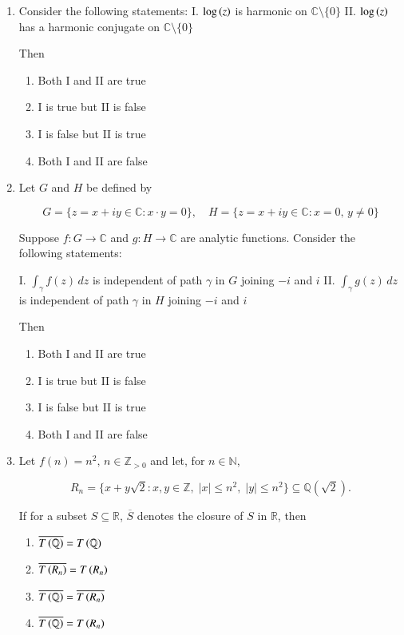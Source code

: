 \documentclass[journal,12pt,onecolumn]{IEEEtran}
\theoremstyle{remark}
\begin{document}
\begin{enumerate}[start=1, label=Q.\arabic*]
\hfill{}

\item Consider the following statements:  
I. $\log \left(z\right)$ is harmonic on $\mathbb{C} \setminus \{0\}$  
II. $\log \left(z\right)$ has a harmonic conjugate on $\mathbb{C} \setminus \{0\}$  

Then  

\begin{enumerate}
\item Both I and II are true  
\item I is true but II is false  
\item I is false but II is true  
\item Both I and II are false  
\end{enumerate}

\hfill{}

\item Let $G$ and $H$ be defined by  

\[
G = \{ z = x+iy \in \mathbb{C} : x \cdot y = 0 \}, \quad  
H = \{ z = x+iy \in \mathbb{C} : x = 0, \, y \neq 0 \}
\]

Suppose $f : G \to \mathbb{C}$ and $g : H \to \mathbb{C}$ are analytic functions. Consider the following statements:  

I. $\int_{\gamma} f(z) \, dz$ is independent of path $\gamma$ in $G$ joining $-i$ and $i$  
II. $\int_{\gamma} g(z) \, dz$ is independent of path $\gamma$ in $H$ joining $-i$ and $i$  

Then  

\begin{enumerate}
\item Both I and II are true  
\item I is true but II is false  
\item I is false but II is true  
\item Both I and II are false  
\end{enumerate}

\hfill{}
\item Let $f(n) = n^2, \, n \in \mathbb{Z}_{>0}$ and let, for $n \in \mathbb{N}$,

\[
R_n = \{ x+y\sqrt{2} : x,y \in \mathbb{Z}, \; |x| \leq n^2, \; |y| \leq n^2 \} \subseteq \mathbb{Q}(\sqrt{2}).
\]

If for a subset $S \subseteq \mathbb{R}$, $\overline{S}$ denotes the closure of $S$ in $\mathbb{R}$, then

\begin{enumerate}
\item $\overline{T\left(\mathbb{Q}\right)} = T\left(\mathbb{Q}\right)$  
\item $\overline{T\left(R_n\right)} = T\left(R_n\right)$  
\item $\overline{T\left(\mathbb{Q}\right)} = \overline{T\left(R_n\right)}$  
\item $\overline{T\left(\mathbb{Q}\right)} = T\left(R_n\right)$  
\end{enumerate}


\end{enumerate}
\end{document}
